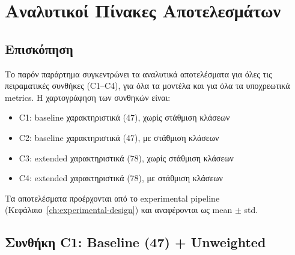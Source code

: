 
\chapter[Παράρτημα: Αναλυτικοί Πίνακες Αποτελεσμάτων]{Αναλυτικοί Πίνακες Αποτελεσμάτων}
\label{app:detailed-results}

\section{Επισκόπηση}

Το παρόν παράρτημα συγκεντρώνει τα αναλυτικά αποτελέσματα για όλες τις πειραματικές συνθήκες (C1--C4), για όλα τα μοντέλα και για όλα τα υποχρεωτικά metrics. Η χαρτογράφηση των συνθηκών είναι:

\begin{itemize}
    \item C1: baseline χαρακτηριστικά (47), χωρίς στάθμιση κλάσεων
    \item C2: baseline χαρακτηριστικά (47), με στάθμιση κλάσεων
    \item C3: extended χαρακτηριστικά (78), χωρίς στάθμιση κλάσεων
    \item C4: extended χαρακτηριστικά (78), με στάθμιση κλάσεων
\end{itemize}

Τα αποτελέσματα προέρχονται από το experimental pipeline (Κεφάλαιο~\ref{ch:experimental-design}) και αναφέρονται ως mean $\pm$ std.

\begingroup
\setlength{\tabcolsep}{2.5pt}
\renewcommand{\arraystretch}{0.95}

\section{Συνθήκη C1: Baseline (47) + Unweighted}

